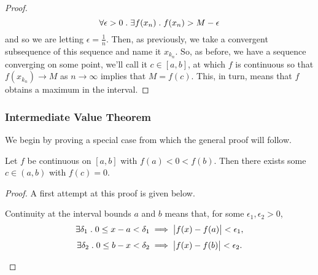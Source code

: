 \documentclass[../MathsNotesBase.tex]{subfiles}
\begin{document}
{\begin{proof}
			\[ \forall \epsilon > 0 \;.\; \exists f(x_n) \;.\; f(x_n) > M - \epsilon \]
			and so we are letting ${ \epsilon = \frac{1}{n} }$. Then, as previously, we take a convergent subsequence of this sequence and name it $x_{k_n}$. So, as before, we have a sequence converging on some point, we'll call it ${ c \in [a,b] }$, at which $f$ is continuous so that ${ f(x_{k_n}) \to M }$ as ${ n \to \infty }$ implies that ${ M = f(c) }$. This, in turn, means that $f$ obtains a maximum in the interval.			 
		\end{proof}
	
		\bigskip
		\subsubsection{Intermediate Value Theorem}
		\medskip
		We begin by proving a special case from which the general proof will follow.
		\begin{lemma}
			Let $f$ be continuous on ${ [a,b] }$ with ${ f(a) < 0 < f(b) }$. Then there exists some ${ c \in (a,b) }$ with ${ f(c) = 0 }$.
		\end{lemma}
		\begin{proof}
			A first attempt at this proof is given below.\\
			\begin{displayquote}
				Continuity at the interval bounds $a$ and $b$ means that, for some ${ \epsilon_1, \epsilon_2 > 0 }$,
				\[ \exists \delta_1 \;.\; 0 \leq x - a < \delta_1 \implies \left\lvert f(x) - f(a)\right\rvert < \epsilon_1, \]
				\[ \exists \delta_2 \;.\; 0 \leq b - x < \delta_2 \implies \left\lvert f(x) - f(b)\right\rvert < \epsilon_2. \]
				

\end{displayquote}
\end{proof}}
\end{document}
